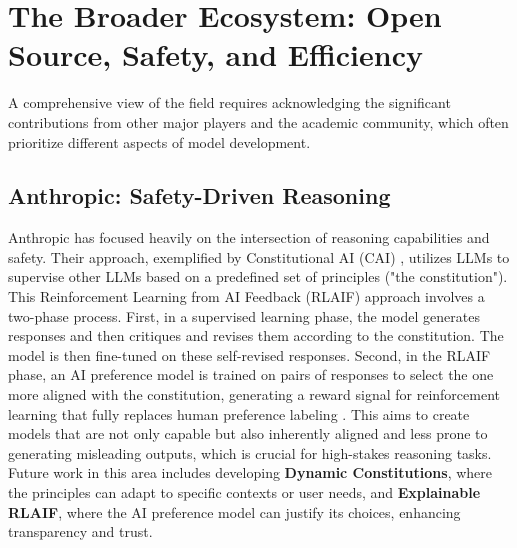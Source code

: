 \documentclass{article}
\begin{document}
\section{The Broader Ecosystem: Open Source, Safety, and Efficiency}
A comprehensive view of the field requires acknowledging the significant contributions from other major players and the academic community, which often prioritize different aspects of model development.

\subsection{Anthropic: Safety-Driven Reasoning}
Anthropic has focused heavily on the intersection of reasoning capabilities and safety. Their approach, exemplified by Constitutional AI (CAI) \cite{bai2022constitutional}, utilizes LLMs to supervise other LLMs based on a predefined set of principles ("the constitution"). This Reinforcement Learning from AI Feedback (RLAIF) approach involves a two-phase process. First, in a supervised learning phase, the model generates responses and then critiques and revises them according to the constitution. The model is then fine-tuned on these self-revised responses. Second, in the RLAIF phase, an AI preference model is trained on pairs of responses to select the one more aligned with the constitution, generating a reward signal for reinforcement learning that fully replaces human preference labeling \cite{bai2022constitutional}. This aims to create models that are not only capable but also inherently aligned and less prone to generating misleading outputs, which is crucial for high-stakes reasoning tasks. Future work in this area includes developing \textbf{Dynamic Constitutions}, where the principles can adapt to specific contexts or user needs, and \textbf{Explainable RLAIF}, where the AI preference model can justify its choices, enhancing transparency and trust.
\end{document}
